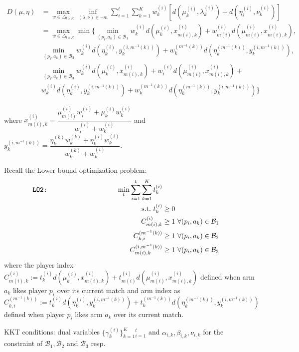 \documentclass{article}
\begin{document}
   \begin{align*}
        D(\mu,\eta) &= \max_{w\in\Delta_{t\times K}}\inf_{(\lambda,\nu)\in\neg m}\sum_{i=1}^t\sum_{k=1}^K w^{(i)}_k \left[d(\mu^{(i)}_k,\lambda^{(i)}_k)+d(\eta^{(i)}_i,\nu^{(i)}_k)\right]\\
      &= \max_{w\in\Delta_{t\times K}}\min\Bigg\{\min_{(p_i,a_k)\in \mathcal{B}_1} w^{(i)}_k d(\mu^{(i)}_k,x^{(i)}_{m(i),k} )+w^{(i)}_{m(i)} d(\mu^{(i)}_{m(i)} ,x^{(i)}_{m(i),k} ),\\
      &\min_{(p_i,a_k)\in \mathcal{B}_2} w^{(i)}_k d(\eta^{(i)}_k,y^{(i,m^{-1}(k))}_{k})+w^{(m^{-1}(k))}_{k}d(\eta^{(m^{-1}(k))}_{k},y^{(i,m^{-1}(k))}_{k}),\\
      &\min_{(p_i,a_k)\in \mathcal{B}_3} w^{(i)}_k d(\mu^{(i)}_k,x^{(i)}_{m(i),k} )+w^{(i)}_{i} d(\mu^{(i)}_{m(i)} ,x^{(i)}_{m(i),k} )+\\
      &w^{(i)}_k d(\eta^{(i)}_k,y^{(i,m^{-1}(k))}_{k})+w^{(m^{-1}(k))}_{k}d(\eta^{(m^{-1}(k))}_{k},y^{(i,m^{-1}(k))}_{k})\Bigg\}
    \end{align*}

where $x^{(i)}_{m(i),k}= \dfrac{\mu^{(i)}_{m(i)}w^{(i)}_{i}+\mu^{(i)}_{k}w^{(i)}_{k}}{w^{(i)}_{i}+w^{(i)}_{k}}$ and  $y^{(i,m^{-1}(k))}_{k}= \dfrac{\eta^{(k)}_{k}w^{(k)}_{k}+\eta^{(i)}_kw^{(i)}_k}{w^{(k)}_{k}+w^{(i)}_k}$.


Recall the 
  Lower bound optimization problem: 
    \begin{align*}
 \texttt{\textbf{LO2}:}\quad\quad \quad\quad \quad\quad \quad\quad \quad\quad  \min_{t}  \sum_{i=1}^t\sum_{k=1}^K t_k^{(i)}\\
    \text{s.t.}\ t^{(i)}_k&\geq 0\\
  C^{(i)}_{m(i),k}&\geq 1 \ \forall (p_i,a_k)\in \mathcal{B}_1\\
C^{(m^{-1}(k))}_{k,i}&\geq 1 \ \forall (p_i,a_k)\in \mathcal{B}_2\\
C^{(i,m^{-1}(k))}_{m(i),k}&\geq 1 \ \forall (p_i,a_k)\in \mathcal{B}_3
\end{align*}
where the player index 
$C^{(i)}_{m(i),k}:=t^{(i)}_k d(\mu^{(i)}_k,x^{(i)}_{m(i),k} )+t^{(i)}_{m(i)} d(\mu^{(i)}_{m(i)} ,x^{(i)}_{m(i),k})$ defined when arm $a_k$ likes player $p_i$ over its current match
and arm index as 
$C^{(m^{-1}(k))}_{k,i}:=t^{(i)}_k d(\eta^{(i)}_k,y^{(i,m^{-1}(k))}_{k})+t^{(m^{-1}(k))}_{k}d(\eta^{(m^{-1}(k))}_{k},y^{(i,m^{-1}(k))}_{k})$ defined when player $p_i$ likes arm $a_k$ over its current match.


KKT conditions: dual variables $\{\gamma^{(i)}_k\}_{k=1}^{K}\phantom{}_{i=1}^t$ and $\alpha_{i,k},\beta_{i,k},\nu_{i,k}$ for the constraint of $\mathcal{B}_1,\mathcal{B}_2$ and $\mathcal{B}_3$ resp.
\end{document}
